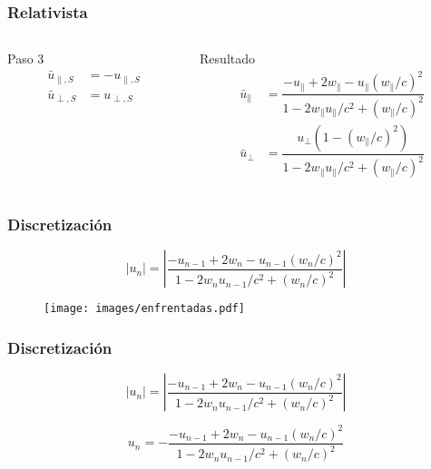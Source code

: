 \documentclass{beamer}
\begin{document}
\begin{frame}[t]
    \frametitle[prueb1]{Relativista}
    \begin{columns}
        \begin{column}{0.5\textwidth}
            \begin{block}{Paso 3}
                \begin{align*}
                    \bar{u}_{\parallel, S} &= -u_{\parallel, S} \\[9.5mm]
                    \bar{u}_{\perp, S} &= u_{\perp, S}
                \end{align*}
                \vspace{2.2mm}
            \end{block}
        \end{column}
        \begin{column}{0.5\textwidth}
            \begin{block}{Resultado}
                \begin{align*}
                    \bar{u}_\parallel &= \dfrac{-u_\parallel + 2w_\parallel - u_\parallel(w_\parallel/c)^2}{1 - 2w_\parallel u_\parallel / c^2 + (w_\parallel/c)^2} \\[5mm]
                    \bar{u}_\perp &= \dfrac{u_\perp\left(1 - (w_\parallel/c)^2\right)}{1 - 2w_\parallel u_\parallel / c^2 + (w_\parallel/c)^2}
                \end{align*}
            \end{block}
        \end{column}
    \end{columns}
\end{frame}

\begin{frame}
    \frametitle[prueb1]{Discretización}
    \begin{equation*}
        \left| u_n \right| = \left|  \dfrac{-u_{n-1} + 2w_n - u_{n-1}(w_n/c)^2}{1 - 2w_n u_{n-1}/c^2 + (w_n/c)^2} \right|
    \end{equation*}
    \begin{figure}
        \texttt{[image: images/enfrentadas.pdf]}
    \end{figure}
\end{frame}

\begin{frame}
    \frametitle[prueb1]{Discretización}
    \begin{equation*}
        \left| u_n \right| = \left|  \dfrac{-u_{n-1} + 2w_n - u_{n-1}(w_n/c)^2}{1 - 2w_n u_{n-1}/c^2 + (w_n/c)^2} \right|
    \end{equation*}
    \begin{equation*}
        u_n = -\dfrac{-u_{n-1} + 2w_n - u_{n-1}(w_n/c)^2}{1 - 2w_n u_{n-1}/c^2 + (w_n/c)^2}
    \end{equation*}
\end{frame}
\end{document}
